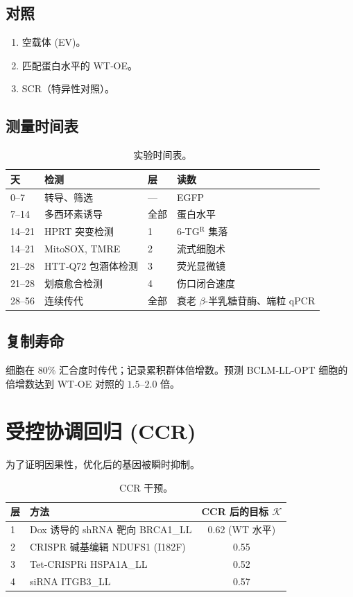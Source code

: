 \documentclass[12pt,a4paper]{article}
\newcommand{\REL}{\mathcal{K}}          %
\begin{document}
	\subsection{对照}
	\begin{enumerate}
		\item 空载体 (EV)。
		\item 匹配蛋白水平的 WT‑OE。
		\item SCR（特异性对照）。
	\end{enumerate}
	
	\subsection{测量时间表}
	\begin{table}[H]
		\centering
		\caption{实验时间表。}
		\label{tab:schedule}
		\begin{tabular}{@{}llll@{}}
			\toprule
			\textbf{天} & \textbf{检测} & \textbf{层} & \textbf{读数} \\
			\midrule
			0–7   & 转导、筛选 & --- & EGFP \\
			7–14  & 多西环素诱导 & 全部 & 蛋白水平 \\
			14–21 & HPRT 突变检测 & 1 & 6‑TG\(^{\mathrm{R}}\) 集落 \\
			14–21 & MitoSOX, TMRE & 2 & 流式细胞术 \\
			21–28 & HTT‑Q72 包涵体检测 & 3 & 荧光显微镜 \\
			21–28 & 划痕愈合检测 & 4 & 伤口闭合速度 \\
			28–56 & 连续传代 & 全部 & 衰老 \(\beta\)-半乳糖苷酶、端粒 qPCR \\
			\bottomrule
		\end{tabular}
	\end{table}
	
	\subsection{复制寿命}
	细胞在 80\% 汇合度时传代；记录累积群体倍增数。预测 BCLM‑LL‑OPT 细胞的倍增数达到 WT‑OE 对照的 \(1.5\)–\(2.0\) 倍。
	
	\section{受控协调回归 (CCR)}
	\label{sec:CCR}
	为了证明因果性，优化后的基因被瞬时抑制。
	
	\begin{table}[H]
		\centering
		\caption{CCR 干预。}
		\label{tab:CCR}
		\begin{tabular}{@{}llc@{}}
			\toprule
			\textbf{层} & \textbf{方法} & \textbf{CCR 后的目标 \(\REL\)} \\
			\midrule
			1 & Dox 诱导的 shRNA 靶向 BRCA1\_LL & 0.62 (WT 水平) \\
			2 & CRISPR 碱基编辑 NDUFS1 (I182F)       & 0.55 \\
			3 & Tet‑CRISPRi HSPA1A\_LL               & 0.52 \\
			4 & siRNA ITGB3\_LL                      & 0.57 \\
			\bottomrule
		\end{tabular}
	\end{table}
	
\end{document}
